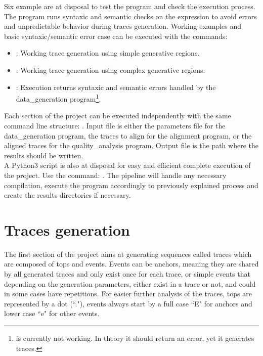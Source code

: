 \documentclass[12pt,a4paper]{article}
\begin{document}
Six example are at disposal to test the program and check the execution process.
The program runs syntaxic and semantic checks on the expression to avoid errors and unpredictable behavior during traces generation.
Working examples and basic syntaxic/semantic error case can be executed with the commands:
\begin{itemize}
	\item {} : Working trace generation using simple generative regions.
	\item {} : Working trace generation using complex generative regions.
	\item {} : Execution returns syntaxic and semantic errors handled by the data\_generation program\footnote{{\selectfont{make test\_semantic4}} is currently not working. In theory it should return an error, yet it generates traces.}.
\end{itemize}


Each section of the project can be executed independently with the same command line structure: {}.
Input file is either the parameters file for the data\_generation program, the traces to align for the alignment program, or the aligned traces for the quality\_analysis program.
Output file is the path where the results should be written.\\

A Python3 script is also at disposal for easy and efficient complete execution of the project.
Use the command: {}.
The pipeline will handle any necessary compilation, execute the program accordingly to previously explained process and create the results directories if necessary.




\section{Traces generation}

The first section of the project aims at generating sequences called traces which are composed of tops and events.
Events can be anchors, meaning they are shared by all generated traces and only exist once for each trace, or simple events that depending on the generation parameters, either exist in a trace or not, and could in some cases have repetitions.
For easier further analysis of the traces, tops are represented by a dot (``."), events always start by a full case ``E" for anchors and lower case ``e" for other events.\\
\end{document}
